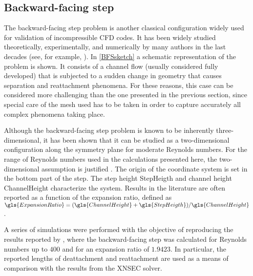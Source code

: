 
\subsection{Backward-facing step}\label{ssec:BackwardFacingStep}
The backward-facing step problem is another classical configuration widely used for validation of incompressible CFD codes. It has been widely studied theoretically, experimentally, and numerically by many authors in the last decades (see, for example, \textcite{armalyExperimentalTheoreticalInvestigation1983,barkleyThreedimensionalInstabilityFlow2000,biswasBackwardFacingStepFlows2004} ).  In \cref{BFSsketch} a schematic representation of the problem is shown. It consists of a channel flow (usually considered fully developed) that is subjected to a sudden change in geometry that causes separation and reattachment phenomena. For these reasons, this case can be considered more challenging than the one presented in the previous section, since special care of the mesh used has to be taken in order to capture accurately all complex phenomena taking place.

Although the backward-facing step problem is known to be inherently three-dimensional, it has been shown that it can be studied as a two-dimensional configuration along the symmetry plane for moderate Reynolds numbers. For the range of Reynolds numbers used in the calculations presented here, the two-dimensional assumption is justified \parencite{barkleyThreedimensionalInstabilityFlow2000, biswasBackwardFacingStepFlows2004}.  The origin of the coordinate system is set in the bottom part of the step. The step height \gls{StepHeigth} and channel height \gls{ChannelHeight} characterize the system. Results in the literature are often reported as a function of the expansion ratio, defined as $\gls{ExpansionRatio} = (\gls{ChannelHeight}+\gls{StepHeigth})/\gls{ChannelHeight}$.

A series of simulations were performed with the objective of reproducing the results reported by \textcite{biswasBackwardFacingStepFlows2004}, where the backward-facing step was calculated for Reynolds numbers up to $400$ and for an expansion ratio of $1.9423$. In particular, the reported lengths of deattachment and reattachment are used as a means of comparison with the results from the XNSEC solver.

